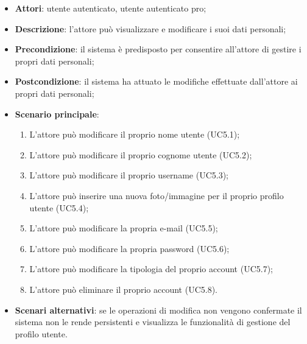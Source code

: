 \begin{itemize}
	\item \textbf{Attori}: utente autenticato, utente autenticato pro;
	\item \textbf{Descrizione}: l'attore può visualizzare e modificare i suoi dati personali;
	\item \textbf{Precondizione}: il sistema è predisposto per consentire all'attore di gestire i propri dati personali;
	\item \textbf{Postcondizione}: il sistema ha attuato le modifiche effettuate dall'attore ai propri dati personali;
	\item \textbf{Scenario principale}:
		\begin{enumerate}
			\item L'attore può modificare il proprio nome utente (UC5.1);
			\item L'attore può modificare il proprio cognome utente (UC5.2);
			\item L'attore può modificare il proprio username (UC5.3);
			\item L'attore può inserire una nuova foto/immagine per il proprio profilo utente (UC5.4);
			\item L'attore può modificare la propria e-mail (UC5.5);
			\item L'attore può modificare la propria password (UC5.6);
			\item L'attore può modificare la tipologia del proprio account (UC5.7);
			\item L'attore può eliminare il proprio account (UC5.8).
		\end{enumerate} 
	\item \textbf{Scenari alternativi}: se le operazioni di modifica non vengono confermate il sistema non le rende persistenti e visualizza le funzionalità di gestione del profilo utente. 
\end{itemize}

